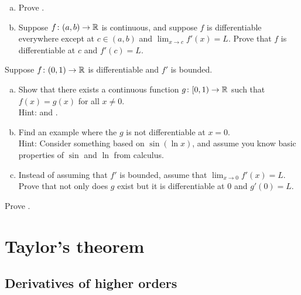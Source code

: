 \begin{exercise} \label{exercise:endpointderivative}
\leavevmode
\begin{enumerate}[a)]
\item
Prove .
\item 
Suppose $f \colon (a,b) \to {\mathbb{R}}$ is continuous, and suppose $f$ is differentiable everywhere except at $c \in
(a,b)$ and $\lim_{x \to c} f'(x) = L$.
Prove that $f$ is differentiable at
$c$ and $f'(c) = L$.
\end{enumerate}
\end{exercise}

\begin{exercise} \label{exercise:extendboundedder}
Suppose $f \colon (0,1) \to {\mathbb{R}}$ is differentiable and $f'$
is bounded.
\begin{enumerate}[a)]
\item
Show that there exists a continuous function $g \colon [0,1) \to {\mathbb{R}}$
such that $f(x) = g(x)$ for all $x \neq 0$.\\
Hint:  and
.
\item
Find an example where the $g$ is not differentiable at $x=0$.
\\
Hint: Consider something based on $\sin(\ln x)$,
and assume you know basic properties of
$\sin$ and $\ln$ from calculus.
\item
Instead of assuming that $f'$ is bounded, assume that $\lim_{x \to 0} f'(x)
= L$.  Prove that not only does $g$ exist but it is differentiable at $0$
and $g'(0) = L$.
\end{enumerate}
\end{exercise}

\begin{exercise}
Prove .
\end{exercise}


\sectionnewpage
\section{Taylor's theorem}
\label{sec:taylor}



\subsection{Derivatives of higher orders}

